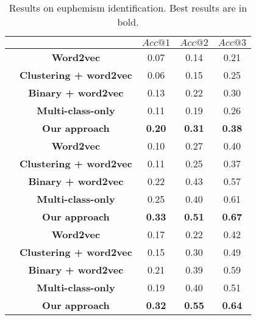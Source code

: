 \begin{table}[ht!]
	\centering
	\small
	\caption{Results on euphemism identification. Best results are in bold.}
	\begin{tabular}{c|c|ccc}
		\toprule
		\multicolumn{2}{c}{}& \textbf{$Acc@1$}  & \textbf{$Acc@2$} &  \textbf{$Acc@3$} \\
		\midrule
		
		\multirow{5}{*}{\rotatebox[origin=c]{90}{\textbf{Drug}}}
		&\textbf{Word2vec} & 0.07 & 0.14 & 0.21 \\
		&\textbf{Clustering + word2vec} & 0.06 & 0.15 & 0.25 \\
		&\textbf{Binary + word2vec} & 0.13 & 0.22 & 0.30 \\
		&\textbf{Multi-class-only} & 0.11 & 0.19 & 0.26 \\
		&\textbf{Our approach} & \textbf{0.20} & \textbf{0.31} & \textbf{0.38} \\
		\midrule		
		
		\multirow{5}{*}{\rotatebox[origin=c]{90}{\textbf{Weapon}}}
		&\textbf{Word2vec} & 0.10 & 0.27 &  0.40 \\
		&\textbf{Clustering + word2vec} & 0.11 & 0.25 & 0.37 \\
		&\textbf{Binary + word2vec} & 0.22 & 0.43 & 0.57 \\
		&\textbf{Multi-class-only} & 0.25  & 0.40 & 0.61 \\
		&\textbf{Our approach} & \textbf{0.33} & \textbf{0.51} & \textbf{0.67} \\
		\midrule
		
		\multirow{5}{*}{\rotatebox[origin=c]{90}{\textbf{Sexuality}}}
		&\textbf{Word2vec} & 0.17 & 0.22 & 0.42 \\
		&\textbf{Clustering + word2vec} & 0.15 & 0.30 & 0.49 \\
		&\textbf{Binary + word2vec} & 0.21 & 0.39 & 0.59 \\
		&\textbf{Multi-class-only} &  0.19 & 0.40 & 0.51 \\
		&\textbf{Our approach} & \textbf{0.32} & \textbf{0.55} & \textbf{0.64} \\
		\bottomrule
	\end{tabular}
	\label{table:res_iden}
\end{table}




